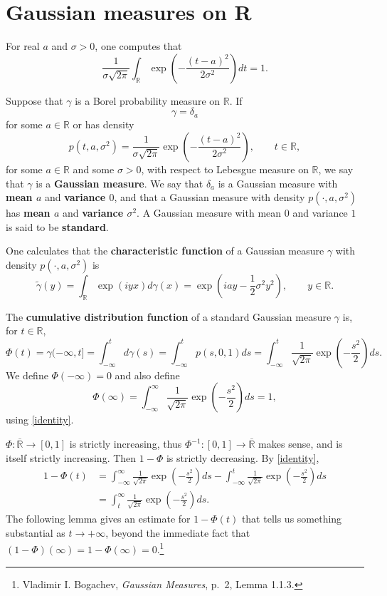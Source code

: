 \documentclass{article}
\theoremstyle{definition}
\theoremstyle{definition}
\begin{document}
\section{Gaussian measures on \textbf{R}}
For real $a$ and $\sigma>0$, one computes that
\begin{equation}
\frac{1}{\sigma \sqrt{2\pi}} \int_{\mathbb{R}} \exp\left( - \frac{(t-a)^2}{2\sigma^2} \right) dt = 1.
\label{identity}
\end{equation}

Suppose that $\gamma$ is a Borel probability measure on $\mathbb{R}$. If 
\[
\gamma=\delta_a
\]
 for some
$a \in \mathbb{R}$ or has density
\[
p(t,a,\sigma^2) = \frac{1}{\sigma\sqrt{2\pi}}  \exp\left( - \frac{(t-a)^2}{2\sigma^2} \right),
\qquad t \in \mathbb{R},
\]
for some $a \in \mathbb{R}$ and some $\sigma>0$,
with respect to Lebesgue measure on $\mathbb{R}$, we say that $\gamma$ is a \textbf{Gaussian measure}.
We say that $\delta_a$ is a Gaussian measure with \textbf{mean $a$} and \textbf{variance $0$}, and
that a Gaussian measure with density $p(\cdot,a,\sigma^2)$ has \textbf{mean $a$} and \textbf{variance $\sigma^2$}.
A Gaussian measure with mean $0$ and variance $1$ is said to be \textbf{standard}.

One calculates that the \textbf{characteristic function} of a Gaussian measure $\gamma$ with density $p(\cdot,a,\sigma^2)$
is
\begin{equation}
\widetilde{\gamma}(y) = \int_{\mathbb{R}} \exp(i yx) d\gamma(x)
=\exp\left( iay - \frac{1}{2}\sigma^2 y^2 \right), \qquad y \in \mathbb{R}.
\label{characteristic}
\end{equation}

The \textbf{cumulative distribution function} of a standard Gaussian measure  $\gamma$ is, for
$t \in \mathbb{R}$,
\[
\Phi(t) = \gamma(-\infty,t] =\int_{-\infty}^t d\gamma(s) = 
\int_{-\infty}^t p(s,0,1) ds
=\int_{-\infty}^t \frac{1}{\sqrt{2\pi}} \exp\left(- \frac{s^2}{2} \right) ds.
\]
We define $\Phi(-\infty)=0$ and also define 
\[
\Phi(\infty) = \int_{-\infty}^\infty \frac{1}{\sqrt{2\pi}} \exp\left(- \frac{s^2}{2} \right) ds = 1,
\]
using \eqref{identity}.

$\Phi:\overline{\mathbb{R}} \to [0,1]$ is strictly increasing, thus 
$\Phi^{-1}:[0,1] \to \overline{\mathbb{R}}$ makes sense, and is itself strictly increasing. Then 
$1-\Phi$ is strictly decreasing.
By \eqref{identity},
\begin{align*}
1-\Phi(t) &=  \int_{-\infty}^\infty \frac{1}{\sqrt{2\pi}} \exp\left( - \frac{s^2}{2} \right) ds
-\int_{-\infty}^t \frac{1}{\sqrt{2\pi}} \exp\left(- \frac{s^2}{2} \right) ds\\
&=\int_t^\infty \frac{1}{\sqrt{2\pi}} \exp\left(- \frac{s^2}{2} \right) ds.
\end{align*}
The following lemma gives an estimate for
$1-\Phi(t)$ that tells us something substantial as $t \to +\infty$, beyond the immediate fact that $(1-\Phi)(\infty)=1-\Phi(\infty)=0$.\footnote{Vladimir I. Bogachev,
{\em Gaussian Measures}, p.~2, Lemma 1.1.3.}
\end{document}

